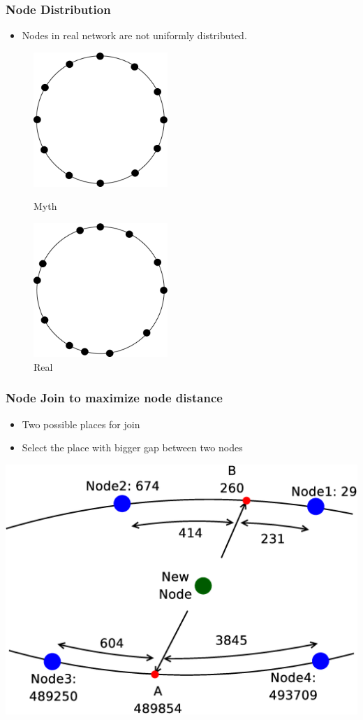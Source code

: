 \documentclass[red]{beamer}
\begin{document}
\begin{frame}
\frametitle{Node Distribution}
\begin{itemize}
\item Nodes in real network are not uniformly distributed. 
\end{itemize}
\begin{figure}
\begin{minipage}{5cm}
\centering
\includegraphics[width=2.0in]{figs/myth}
\caption{Myth} 
\end{minipage}
\begin{minipage}{5cm}
\centering
\includegraphics[width=2.0in]{figs/real}
\caption{Real}
\end{minipage}
\end{figure}

\end{frame}
\begin{frame}
\frametitle{Node Join to maximize node distance}
\begin{itemize}
\item Two possible places for join 
\item Select the place with bigger gap between two nodes
\end{itemize}
\center
\includegraphics[angle=0,scale=0.2]{figs/evenNet}

\end{frame}
\end{document}
